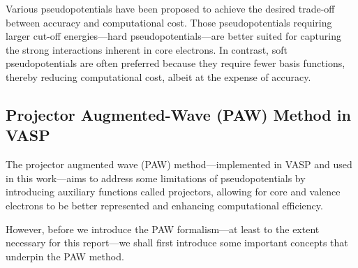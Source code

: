 Various pseudopotentials have been proposed to achieve the desired trade-off between accuracy and computational cost. Those pseudopotentials requiring larger cut-off energies---hard pseudopotentials---are better suited for capturing the strong interactions inherent in core electrons. In contrast, soft pseudopotentials are often preferred because they require fewer basis functions, thereby reducing computational cost, albeit at the expense of accuracy.

\subsection{Projector Augmented-Wave (PAW) Method in VASP}
The projector augmented wave (PAW) method---implemented in VASP and used in this work---aims to address some limitations of pseudopotentials by introducing auxiliary functions called projectors, allowing for core and valence electrons to be better represented and enhancing computational efficiency. 

However, before we introduce the PAW formalism---at least to the extent necessary for this report---we shall first introduce some important concepts that underpin the PAW method.
